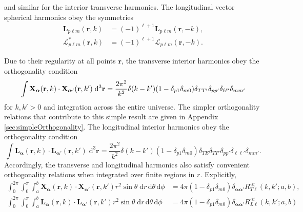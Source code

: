 and similar for the interior transverse harmonics. The longitudinal vector spherical harmonics obey the symmetries
\begin{equation}
\begin{split}
\mathbf{L}_{p\ell m}(\mathbf{r},k) &= (-1)^{\ell+1}\mathbf{L}_{p\ell m}(\mathbf{r},-k),\\
\bm{\mathcal{L}}_{p\ell m}^*(\mathbf{r},k) &= (-1)^{\ell+1}\bm{\mathcal{L}}_{p\ell m}(\mathbf{r},-k).
\end{split}
\end{equation}

Due to their regularity at all points $\mathbf{r}$, the transverse interior harmonics obey the orthogonality condition
\begin{equation}\label{eq:vectorSphericalHarmonicOrthogonality}
\int \mathbf{X}_{\bm{\alpha}}(\mathbf{r},k)\cdot\mathbf{X}_{\bm{\alpha}'}(\mathbf{r},k')\;\mathrm{d}^3\mathbf{r} = \frac{2\pi^2}{k^2}\delta(k - k')(1 - \delta_{p1}\delta_{m0})\delta_{TT'}\delta_{pp'}\delta_{\ell\ell'}\delta_{mm'}\\
\end{equation}
for $k,k' > 0$ and integration across the entire universe. The simpler orthogonality relations that contribute to this simple result are given in Appendix \ref{sec:simpleOrthogonality}. The longitudinal interior harmonics obey the orthogonality condition
\begin{equation}\label{eq:longitudinalHarmonicOrthogonality}
\int\mathbf{L}_{\bm{\alpha}}(\mathbf{r},k)\cdot\mathbf{L}_{\bm{\alpha}'}(\mathbf{r},k')\;\mathrm{d}^3\mathbf{r} = \frac{2\pi^2}{k^2}\delta(k - k')(1 - \delta_{p1}\delta_{m0})\delta_{TE}\delta_{TT'}\delta_{pp'}\delta_{\ell\ell'}\delta_{mm'}.
\end{equation}
Accordingly, the transverse and longitudinal harmonics also satisfy convenient orthogonality relations when integrated over finite regions in $r$. Explicitly,
\begin{equation}\label{eq:vectorSphericalHarmonicOrthogonalityConditionFinite}
\begin{split}
\int_0^{2\pi}\int_0^\pi\int_a^b\mathbf{X}_{\bm{\alpha}}(\mathbf{r},k)\cdot\mathbf{X}_{\bm{\alpha}'}(\mathbf{r},k')r^2\sin\theta\;\mathrm{d}r\,\mathrm{d}\theta\,\mathrm{d}\phi &= 4\pi(1 - \delta_{p1}\delta_{m0})\delta_{\bm{\alpha}\bm{\alpha}'}R_{T\ell}^{\ll}(k,k';a,b),\\
\int_0^{2\pi}\int_0^\pi\int_a^b\mathbf{L}_{\bm{\alpha}}(\mathbf{r},k)\cdot\mathbf{L}_{\bm{\alpha}'}(\mathbf{r},k')r^2\sin\theta\;\mathrm{d}r\,\mathrm{d}\theta\,\mathrm{d}\phi &= 4\pi(1 - \delta_{p1}\delta_{m0})\delta_{\bm{\alpha}\bm{\alpha}'}R_{L\ell}^{\ll}(k,k';a,b)
\end{split}
\end{equation}
